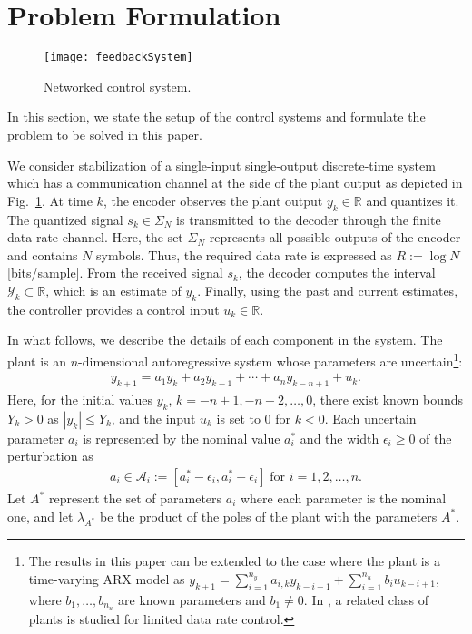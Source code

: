 \documentclass[a4paper, 11pt]{article}
\newcommand{\R}{\mathbb{R}}
\newcommand{\calY}{\mathcal{Y}}
\newcommand{\calA}{\mathcal{A}}
\newcommand{\lambdaAS}{\lambda_{A^*}\!}
\theoremstyle{definition}
\newcommand{\fref}[1]{Fig.~\ref{#1}}
\begin{document}
\section{Problem Formulation}\label{sec,problem}
\begin{figure}[t]
 \centering
 \texttt{[image: feedbackSystem]}
 \caption{Networked control system.}
 \label{fig,system}
\end{figure}
In this section, we state the setup of the control systems and formulate
the problem to be solved in this paper.

We consider stabilization of a single-input single-output discrete-time system
which has a communication channel at the side of the plant output as depicted
in \fref{fig,system}.
At time $k$, the encoder observes the plant output $y_k\in\R$ and quantizes it.
The quantized signal $s_k\in\Sigma_N$ is transmitted to the decoder through
the finite data rate channel.
Here, the set $\Sigma_N$ represents all possible outputs of the encoder
and contains $N$ symbols.
Thus, the required data rate is expressed as $R:=\log N$ [bits/sample].
From the received signal $s_k$, the decoder computes the interval $\calY_k\subset \R$,
which is an estimate of $y_k$.
Finally, using the past and current estimates, the controller provides
a control input $u_k\in\R$.

In what follows, we describe the details of each component in the system.
The plant is an $n$-dimensional autoregressive system
whose parameters are uncertain\footnote{
The results in this paper can be extended to the case where
the plant is a time-varying ARX model as
$y_{k+1}=\sum^{n_y}_{i=1}a_{i,k}y_{k-i+1}+\sum^{n_u}_{i=1}b_iu_{k-i+1}$,
where $b_1,\dots,b_{n_u}$ are known parameters and $b_1\neq0$.
In \cite{Nair2000}, a related class of plants is studied for limited
data rate control.}:
\begin{align}
  y_{k+1}=a_{1}y_k+a_{2}y_{k-1}+\cdots+a_{n}y_{k-n+1}+u_k.\label{AR}
\end{align}
Here, for the initial values $y_k$, $k=-n+1, -n+2, \dots, 0$, there exist known
bounds $Y_k>0$ as $|y_k|\leq Y_k$, and the input $u_k$ is set to $0$ for $k<0$.
Each uncertain parameter $a_{i}$ is represented by the nominal value $a_i^*$
and the width $\epsilon_i\geq 0$ of the perturbation as
\begin{gather}
 a_{i}\in\calA_i:=\left[a_i^*-\epsilon_i, a_i^*+\epsilon_i\right]\;
 \text{for }i=1,2,\dots,n.\label{uncertainty}
\end{gather}
Let $A^*$ represent the set of parameters $a_i$ where each parameter
is the nominal one, and let $\lambdaAS$ be the product of the poles of the
plant with the parameters $A^*$.
\end{document}
